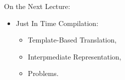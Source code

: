 \begin{frame}{On the Next Lecture:}
\begin{itemize}
\item Just In Time Compilation:
\begin{itemize}
\item Template-Based Translation,
\item Interpmediate Representation,
\item Problems.
\end{itemize}
\end{itemize}
\end{frame}

\finalslide


